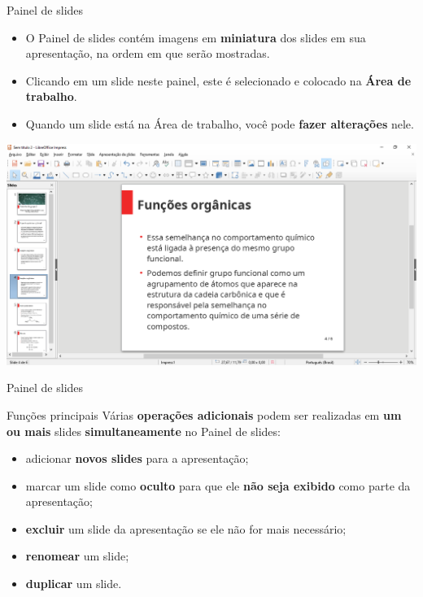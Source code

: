 \begin{frame}{Painel de slides}
	\begin{block}{}
		\begin{itemize}
			\item O Painel de slides contém imagens em \textbf{miniatura} dos slides em sua apresentação, na ordem em que serão mostradas.
			\item Clicando em um slide neste painel, este é selecionado e colocado na \textbf{Área de trabalho}.
			\item Quando um slide está na Área de trabalho, você pode \textbf{fazer alterações }nele.
		\end{itemize}
	\end{block}

	\centering
	\includegraphics[width=0.7\linewidth]{Figuras/Ch05/fig8}
\end{frame}


\begin{frame}{Painel de slides}
	\begin{block}{Funções principais}
		Várias \textbf{operações adicionais} podem ser realizadas em \textbf{um ou mais} slides \textbf{simultaneamente} no Painel de slides:
		\begin{itemize}
			\item adicionar \textbf{novos slides} para a apresentação;
			\item marcar um slide como \textbf{oculto} para que ele \textbf{não seja exibido} como parte da apresentação;
			\item \textbf{excluir} um slide da apresentação se ele não for mais necessário;
			\item \textbf{renomear} um slide;
			\item \textbf{duplicar} um slide.
		\end{itemize}
	\end{block}
\end{frame}


